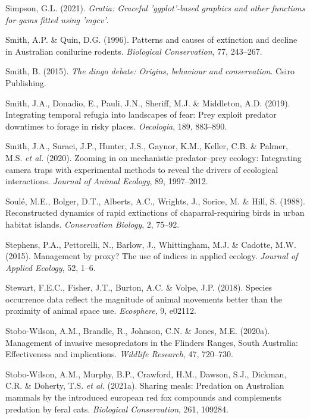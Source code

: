 \documentclass[11pt,a4paper,titlepage,twoside,openright]{style/unimelbthesis}
\begin{document}
\begin{mainmatter}
\leavevmode\hypertarget{ref-gratia}{}%
Simpson, G.L. (2021). \emph{Gratia: Graceful 'ggplot'-based graphics and other functions for gams fitted using 'mgcv'}.

\leavevmode\hypertarget{ref-smith1996patterns}{}%
Smith, A.P. \& Quin, D.G. (1996). Patterns and causes of extinction and decline in Australian conilurine rodents. \emph{Biological Conservation}, 77, 243--267.

\leavevmode\hypertarget{ref-smith2015dingo}{}%
Smith, B. (2015). \emph{The dingo debate: Origins, behaviour and conservation}. Csiro Publishing.

\leavevmode\hypertarget{ref-smith2019integrating}{}%
Smith, J.A., Donadio, E., Pauli, J.N., Sheriff, M.J. \& Middleton, A.D. (2019). Integrating temporal refugia into landscapes of fear: Prey exploit predator downtimes to forage in risky places. \emph{Oecologia}, 189, 883--890.

\leavevmode\hypertarget{ref-smith2020zooming}{}%
Smith, J.A., Suraci, J.P., Hunter, J.S., Gaynor, K.M., Keller, C.B. \& Palmer, M.S. \emph{et al.} (2020). Zooming in on mechanistic predator--prey ecology: Integrating camera traps with experimental methods to reveal the drivers of ecological interactions. \emph{Journal of Animal Ecology}, 89, 1997--2012.

\leavevmode\hypertarget{ref-soule1988reconstructed}{}%
Soulé, M.E., Bolger, D.T., Alberts, A.C., Wrights, J., Sorice, M. \& Hill, S. (1988). Reconstructed dynamics of rapid extinctions of chaparral-requiring birds in urban habitat islands. \emph{Conservation Biology}, 2, 75--92.

\leavevmode\hypertarget{ref-stephens2015management}{}%
Stephens, P.A., Pettorelli, N., Barlow, J., Whittingham, M.J. \& Cadotte, M.W. (2015). Management by proxy? The use of indices in applied ecology. \emph{Journal of Applied Ecology}, 52, 1--6.

\leavevmode\hypertarget{ref-stewart2018species}{}%
Stewart, F.E.C., Fisher, J.T., Burton, A.C. \& Volpe, J.P. (2018). Species occurrence data reflect the magnitude of animal movements better than the proximity of animal space use. \emph{Ecosphere}, 9, e02112.

\leavevmode\hypertarget{ref-stobo2020management}{}%
Stobo-Wilson, A.M., Brandle, R., Johnson, C.N. \& Jones, M.E. (2020a). Management of invasive mesopredators in the Flinders Ranges, South Australia: Effectiveness and implications. \emph{Wildlife Research}, 47, 720--730.

\leavevmode\hypertarget{ref-stobo2021sharing}{}%
Stobo-Wilson, A.M., Murphy, B.P., Crawford, H.M., Dawson, S.J., Dickman, C.R. \& Doherty, T.S. \emph{et al.} (2021a). Sharing meals: Predation on Australian mammals by the introduced european red fox compounds and complements predation by feral cats. \emph{Biological Conservation}, 261, 109284.


\end{mainmatter}
\end{document}
